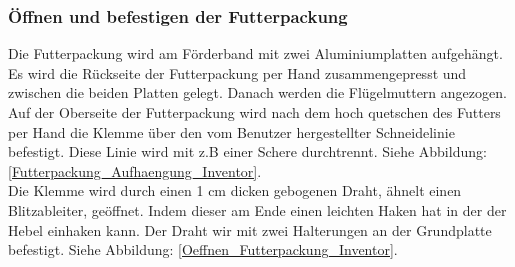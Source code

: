 \subsubsection{Öffnen und befestigen der Futterpackung}

Die Futterpackung wird am Förderband mit zwei Aluminiumplatten aufgehängt. Es wird die Rückseite der Futterpackung per Hand zusammengepresst und zwischen die beiden Platten gelegt. Danach werden die Flügelmuttern angezogen. Auf der Oberseite der Futterpackung wird nach dem hoch quetschen des Futters per Hand die Klemme über den vom Benutzer hergestellter Schneidelinie befestigt. Diese Linie wird mit z.B einer Schere durchtrennt. Siehe Abbildung: \ref{Futterpackung_Aufhaengung_Inventor}.\\

Die Klemme wird durch einen 1 cm dicken gebogenen Draht, ähnelt einen Blitzableiter, geöffnet. Indem dieser am Ende einen leichten Haken hat in der der Hebel einhaken kann. Der Draht wir mit zwei Halterungen an der Grundplatte befestigt. Siehe Abbildung: \ref{Oeffnen_Futterpackung_Inventor}.

